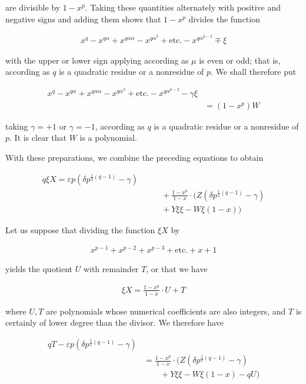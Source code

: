 are divisible by $1-x^p$. Taking these quantities alternately with positive and negative signs and adding them shows that $1-x^p$ divides the function

\[
\begin{aligned}
x^q-x^{q\alpha}+x^{q\alpha\alpha}-x^{q\alpha^3}+\text{etc.}-x^{q\alpha^{p-2}}\mp\xi
\end{aligned}
\]

with the upper or lower sign applying according as $\mu$ is even or odd; that is, according as $q$ is a quadratic residue or a nonresidue of $p$. We shall therefore put

\[
\begin{aligned}
x^q-x^{q\alpha}+x^{q\alpha\alpha}- x^{q\alpha^3}+\text{etc.}-x^{q\alpha^{p-2}}-\gamma\xi\\&=(1-x^p)W
\end{aligned}
\]

taking $\gamma=+1$ or $\gamma=-1$, according as $q$ is a quadratic residue or a nonresidue of $p$. It is clear that $W$ is a polynomial.


With these preparations, we combine the preceding equations to obtain

\[
\begin{aligned}
q\xi X=\varepsilon p(\delta p^{\frac12(q-1)}-\gamma)\\&\qquad+\frac{1-x^p}{1-x}\cdot(Z(\delta p^{\frac12(q-1)}-\gamma)\\&\qquad+Y\xi\xi-W\xi(1-x))
\end{aligned}
\]

Let us suppose that dividing the function $\xi X$ by

\[
\begin{aligned}
x^{p-1}+x^{p-2}+x^{p-3}+\text{etc.}+x+1
\end{aligned}
\]

yields the quotient $U$ with remainder $T$, or that we have

\[
\begin{aligned}
\xi X=\frac{1-x^p}{1-x}\cdot U+T
\end{aligned}
\]

where $U,T$ are polynomials whose numerical coefficients are also integers, and $T$ is certainly of lower degree than the divisor. We therefore have

\[
\begin{aligned}
qT-\varepsilon p(\delta p^{\frac12(q-1)}-\gamma)\\&=\frac{1-x^p}{1-x}\cdot(Z(\delta p^{\frac12(q-1)}-\gamma)\\&\qquad+Y\xi\xi-W\xi(1-x)-qU)
\end{aligned}
\]

